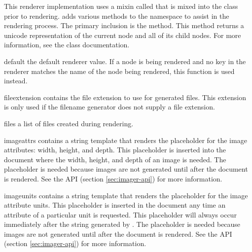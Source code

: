 This renderer implementation uses a mixin called  that
is mixed into the  class prior to rendering.  
adds various methods to the  namespace to assist in the
rendering process.  The primary inclusion is the 
method.  This method returns a unicode representation of the current node
and all of its child nodes.  For more information, see the 
class documentation.

\begin{memberdesc}[Renderer]{default}
the default renderer value.  If a node is being rendered and no key in
the renderer matches the name of the node being rendered, this 
function is used instead.
\end{memberdesc}

\begin{memberdesc}[Renderer]{fileextension}
contains the file extension to use for generated files.  This extension is
only used if the filename generator does not supply a file extension.
\end{memberdesc}

\begin{memberdesc}[Renderer]{files}
a list of files created during rendering.
\end{memberdesc}

\begin{memberdesc}[Renderer]{imageattrs}
contains a string template that renders the placeholder for the image 
attributes: width, height, and depth.  This placeholder is inserted into
the document where the width, height, and depth of an image is needed.
The placeholder is needed because images are not generated until after
the document is rendered.  See the  API 
(section \ref{sec:imager-api}) for more information.
\end{memberdesc}

\begin{memberdesc}[Renderer]{imageunits}
contains a string template that renders the placeholder for the image 
attribute units.  This placeholder is inserted in the document any time
an attribute of a particular unit is requested.  This placeholder will
always occur immediately after the string generated by .
The placeholder is needed because images are not generated until after
the document is rendered.  See the  API 
(section \ref{sec:imager-api}) for more information.
\end{memberdesc}

